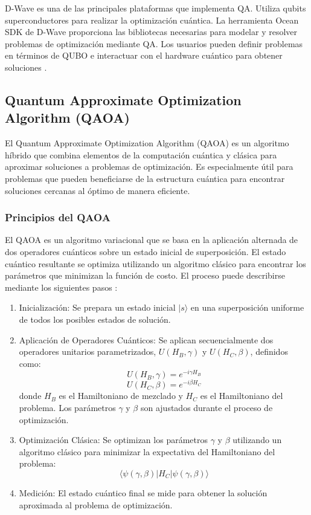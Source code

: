\documentclass[11pt,a4paper,spanish]{book}
\begin{document}
D-Wave es una de las principales plataformas que implementa QA. Utiliza qubits superconductores para realizar la optimización cuántica. La herramienta Ocean SDK de D-Wave proporciona las bibliotecas necesarias para modelar y resolver problemas de optimización mediante QA. Los usuarios pueden definir problemas en términos de QUBO e interactuar con el hardware cuántico para obtener soluciones \cite{gibneyQuantumTech}.

\subsection{Quantum Approximate Optimization Algorithm (QAOA)}

El Quantum Approximate Optimization Algorithm (QAOA) es un algoritmo híbrido que combina elementos de la computación cuántica y clásica para aproximar soluciones a problemas de optimización. Es especialmente útil para problemas que pueden beneficiarse de la estructura cuántica para encontrar soluciones cercanas al óptimo de manera eficiente.

\subsubsection{Principios del QAOA}

El QAOA es un algoritmo variacional que se basa en la aplicación alternada de dos operadores cuánticos sobre un estado inicial de superposición. El estado cuántico resultante se optimiza utilizando un algoritmo clásico para encontrar los parámetros que minimizan la función de costo. El proceso puede describirse mediante los siguientes pasos \cite{farhiQuantum}:

\begin{enumerate}
	\item Inicialización: Se prepara un estado inicial \(\lvert s \rangle\) en una superposición uniforme de todos los posibles estados de solución.
	\item Aplicación de Operadores Cuánticos: Se aplican secuencialmente dos operadores unitarios parametrizados, \(U(H_B, \gamma)\) y \(U(H_C, \beta)\), definidos como:
\[ U(H_B, \gamma) = e^{-i \gamma H_B} \]
\[ U(H_C, \beta) = e^{-i \beta H_C} \]
donde \(H_B\) es el Hamiltoniano de mezclado y \(H_C\) es el Hamiltoniano del problema. Los parámetros \(\gamma\) y \(\beta\) son ajustados durante el proceso de optimización.
	\item Optimización Clásica: Se optimizan los parámetros \(\gamma\) y \(\beta\) utilizando un algoritmo clásico para minimizar la expectativa del Hamiltoniano del problema:
\[ \langle \psi(\gamma, \beta) \lvert H_C \rvert \psi(\gamma, \beta) \rangle \]
	\item Medición: El estado cuántico final se mide para obtener la solución aproximada al problema de optimización.
\end{enumerate}
\end{document}

